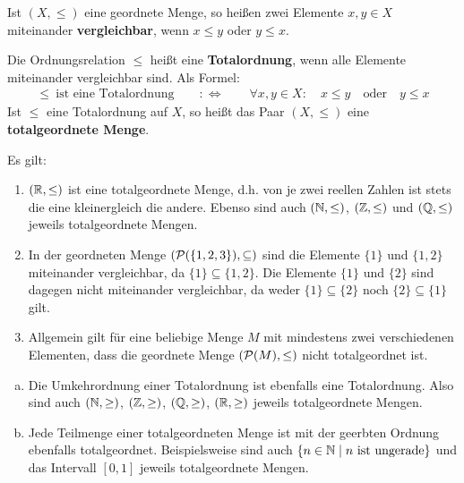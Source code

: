 \begin{de}[Vergleichbarkeit] \label{def:totalordnung}  
    Ist $(X,\le)$ eine geordnete Menge, so heißen zwei Elemente $x,y\in X$ miteinander \textbf{vergleichbar}, wenn $x\le y$ oder $y\le x$.

    Die Ordnungsrelation $\le$ heißt eine \textbf{Totalordnung}, wenn alle Elemente miteinander vergleichbar sind. Als Formel:
    \begin{align*}
        \le\ \text{ist eine Totalordnung}\qquad:\Leftrightarrow\qquad \forall x,y \in X:\quad x\le y\quad \text{oder}\quad y\le x 
    \end{align*}
    Ist $\le$ eine Totalordnung auf $X$, so heißt das Paar $(X,\le)$ eine \textbf{totalgeordnete Menge}.
\end{de}


\begin{bsp}
    Es gilt:
    \begin{enumerate}
        \item $(\mathbb R,\le)$ ist eine totalgeordnete Menge, d.h. von je zwei reellen Zahlen ist stets die eine kleinergleich die andere. Ebenso sind auch $(\mathbb N,\le)$, $(\mathbb Z,\le)$ und $(\mathbb Q,\le)$ jeweils totalgeordnete Mengen.
        \item In der geordneten Menge $(\mathcal P(\{1,2,3\}),\subseteq)$ sind die Elemente $\{1\}$ und $\{1,2\}$ miteinander vergleichbar, da $\{1\}\subseteq \{1,2\}$. Die Elemente $\{1\}$ und $\{2\}$ sind dagegen nicht miteinander vergleichbar, da weder $\{1\}\subseteq\{2\}$ noch $\{2\}\subseteq \{1\}$ gilt.
        \item Allgemein gilt für eine beliebige Menge $M$ mit mindestens zwei verschiedenen Elementen, dass die geordnete Menge $(\mathcal P(M),\le)$ nicht totalgeordnet ist.
    \end{enumerate}
\end{bsp}


\begin{bem} \quad
    \begin{enumerate}[a)]
        \item Die Umkehrordnung einer Totalordnung ist ebenfalls eine Totalordnung. Also sind auch $(\mathbb N,\ge)$, $(\mathbb Z,\ge)$, $(\mathbb Q,\ge)$, $(\mathbb R,\ge)$ jeweils totalgeordnete Mengen.
        \item Jede Teilmenge einer totalgeordneten Menge ist mit der geerbten Ordnung ebenfalls totalgeordnet. Beispielsweise sind auch $\{n\in \mathbb N\mid n\ \text{ist ungerade}\}$ und das Intervall $[0,1]$ jeweils totalgeordnete Mengen.
    \end{enumerate}
\end{bem}


